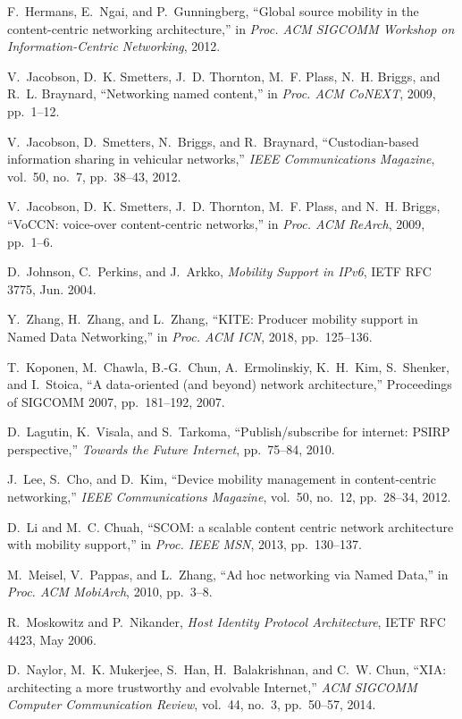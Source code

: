 \begin{thebibliography}{99}
F.~Hermans, E.~Ngai, and P.~Gunningberg,
``Global source mobility in the content-centric networking architecture,''
in \textit{Proc. ACM SIGCOMM Workshop on Information-Centric Networking},
2012.

V.~Jacobson, D.~K. Smetters, J.~D. Thornton, M.~F. Plass, N.~H. Briggs, and R.~L. Braynard,
``Networking named content,''
in \textit{Proc. ACM CoNEXT}, 2009, pp.~1--12.

V.~Jacobson, D.~Smetters, N.~Briggs, and R.~Braynard,
``Custodian-based information sharing in vehicular networks,''
\textit{IEEE Communications Magazine},
vol.~50, no.~7, pp.~38--43, 2012.

V.~Jacobson, D.~K. Smetters, J.~D. Thornton, M.~F. Plass, and N.~H. Briggs,
``VoCCN: voice-over content-centric networks,''
in \textit{Proc. ACM ReArch},
2009, pp.~1--6.

D.~Johnson, C.~Perkins, and J.~Arkko,
\textit{Mobility Support in IPv6},
IETF RFC 3775, Jun. 2004.

Y.~Zhang, H.~Zhang, and L.~Zhang,
``KITE: Producer mobility support in Named Data Networking,''
in \textit{Proc. ACM ICN},
2018, pp.~125--136.

T.~Koponen, M.~Chawla, B.-G.~Chun, A.~Ermolinskiy, K.~H.~Kim, S.~Shenker, and I.~Stoica,
``A data-oriented (and beyond) network architecture,''
Proceedings of SIGCOMM 2007,
pp.~181--192, 2007.

D.~Lagutin, K.~Visala, and S.~Tarkoma,
``Publish/subscribe for internet: PSIRP perspective,''
\textit{Towards the Future Internet},
pp.~75--84, 2010.

J.~Lee, S.~Cho, and D.~Kim,
``Device mobility management in content-centric networking,''
\textit{IEEE Communications Magazine},
vol.~50, no.~12, pp.~28--34, 2012.

D.~Li and M.~C. Chuah,
``SCOM: a scalable content centric network architecture with mobility support,''
in \textit{Proc. IEEE MSN},
2013, pp.~130--137.

M.~Meisel, V.~Pappas, and L.~Zhang,
``Ad hoc networking via Named Data,''
in \textit{Proc. ACM MobiArch},
2010, pp.~3--8.

R.~Moskowitz and P.~Nikander,
\textit{Host Identity Protocol Architecture},
IETF RFC 4423, May 2006.

D.~Naylor, M.~K. Mukerjee, S.~Han, H.~Balakrishnan, and C.~W. Chun,
``XIA: architecting a more trustworthy and evolvable Internet,''
\textit{ACM SIGCOMM Computer Communication Review},
vol.~44, no.~3, pp.~50--57, 2014.


\end{thebibliography}
